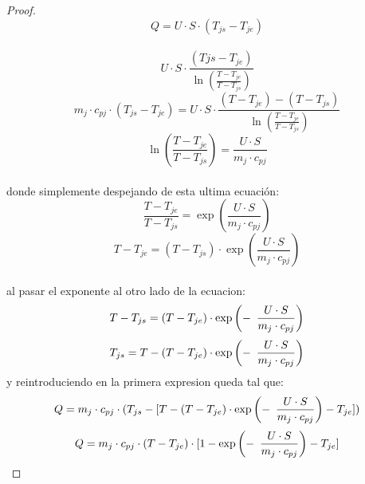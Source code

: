 \documentclass{report}
\begin{document}
\begin{proof}
	\begin{equation*}
		 Q = U\cdot S \cdot (T_{js}-T_{je})
	\end{equation*}\\
	\begin{equation*}
		U \cdot S \cdot \frac{(T{js}-T_{je})}{\ln\left(\frac{T-T_{je}}{T-T_{js}}\right)}
   \end{equation*}
\vspace{0.1cm}
	\begin{equation*}
		m_j \cdot c_{pj} \cdot (T_{js}-T_{je}) = U \cdot S \cdot \frac{(T-T_{je})-(T-T_{js})}{\ln\left(\frac{T-T_{je}}{T-T_{js}}\right)}
	\end{equation*}
	\begin{equation*}
		\ln \left(\frac{T-T_{je}}{T-T_{js}}\right) = \frac{U \cdot S }{m_j \cdot c_{pj}} 
	\end{equation*}\\

	\noindent donde simplemente despejando  de esta ultima ecuación:
	\begin{equation*}
		\frac{T-T_{je}}{T-T_{js}} = \exp\left(\frac{U \cdot S }{m_j \cdot c_{pj}}\right)
	\end{equation*}
	\begin{equation*}
		T - T_{je} = (T-T_{js}) \cdot \exp\left(\frac{U \cdot S }{m_j \cdot c_{pj}}\right) 
	\end{equation*}\\
	al pasar el exponente al otro lado de la ecuacion:\\
	\begin{equation*}
		T-T_{js} = (T - T_{je}) \cdot \exp\left(- \hspace{0.5em}\frac{U \cdot S }{m_j \cdot c_{pj}}\right) 
	\end{equation*}
	\begin{equation*}
		T_{js} = T- (T - T_{je}) \cdot \exp\left(- \hspace{0.5em}\frac{U \cdot S }{m_j \cdot c_{pj}}\right) 
	\end{equation*}
	\noindent y reintroduciendo en la primera expresion queda tal que:
	\begin{equation*}
		Q = m_j \cdot c_{pj} \cdot (T_{js} - [T - (T - T_{je}) \cdot \exp\left(- \hspace{0.5em}\frac{U \cdot S }{m_j \cdot c_{pj}}\right) - T_{je}])
	\end{equation*}
	\begin{equation*}
		Q = m_j \cdot c_{pj} \cdot (T - T_{je}) \cdot  [1 - \exp\left(- \hspace{0.5em}\frac{U \cdot S }{m_j \cdot c_{pj}}\right) - T_{je}]
	\end{equation*}
\end{proof}
\begin{myproof}
\end{myproof}
\end{document}
